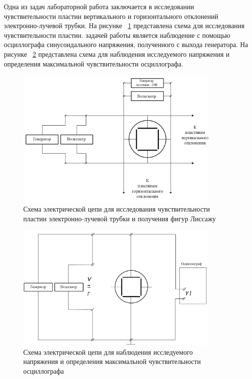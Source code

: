Одна из задач лабораторной работа заключается в исследовании чувствительности пластин вертикального и горизонтального отклонений электронно-лучевой трубки. На рисунке ~\ref{fig:Схема установки 1} представлена схема для исследования чувствительности пластин.
 задачей работы является наблюдение с помощью осциллографа синусоидального напряжения, полученного с выхода генератора. На рисунке ~\ref{fig:Схема установки 2} представлена схема для наблюдения исследуемого напряжения и определения максимальной чувствительности осциллографа.

\begin{figure}[H]
\centering
\includegraphics[width=0.9\textwidth]{Схема установки 1.png}
\caption{Схема электрической цепи для исследования чувствительности пластин
электронно-лучевой трубки и получения фигур Лиссажу}
\label{fig:Схема установки 1}
\end{figure}



\begin{figure}[H]
\centering
\includegraphics[width=0.9\textwidth]{Схема установки 2.png}
\caption{Схема электрической цепи для наблюдения исследуемого напряжения и
определения максимальной чувствительности осциллографа}
\label{fig:Схема установки 2}
\end{figure}


